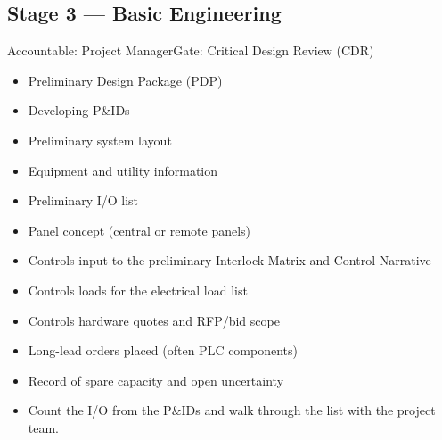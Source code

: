\subsection{Stage 3 --- Basic Engineering}
\begin{stagecard}{Accountable: Project Manager}{Gate: Critical Design Review (CDR)}
\tcbline
\begin{minipage}[t]{0.485\linewidth}
\begin{itemize}[leftmargin=*,itemsep=1pt,topsep=2pt]
  \item Preliminary Design Package (PDP)
  \item Developing P\&IDs
  \item Preliminary system layout
  \item Equipment and utility information
\end{itemize}
\end{minipage}\hfill
\begin{minipage}[t]{0.485\linewidth}
\begin{itemize}[leftmargin=*,itemsep=1pt,topsep=2pt]
  \item Preliminary I/O list
  \item Panel concept (central or remote panels)
  \item Controls input to the preliminary Interlock Matrix and Control Narrative
  \item Controls loads for the electrical load list
  \item Controls hardware quotes and RFP/bid scope
  \item Long-lead orders placed (often PLC components)
  \item Record of spare capacity and open uncertainty
\end{itemize}
\end{minipage}
\tcbline
{}
\begin{itemize}[leftmargin=*,itemsep=1pt,topsep=2pt]
  \item Count the I/O from the P\&IDs and walk through the list with the project team.

\end{itemize}
\end{stagecard}
